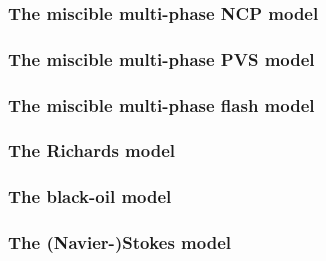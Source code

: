 \subsubsection{The miscible multi-phase NCP model} 


\subsubsection{The miscible multi-phase PVS model} 


\subsubsection{The miscible multi-phase flash model} 


\subsubsection{The Richards model} 


\subsubsection{The black-oil model} 


\subsubsection{The (Navier-)Stokes model} 


